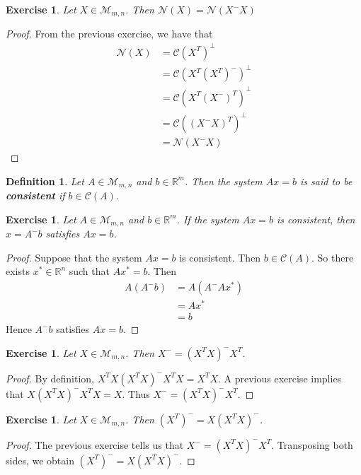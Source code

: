 \documentclass[12pt]{amsart}
\newtheorem{defn}[thm]{Definition}
\newtheorem{ex}[thm]{Exercise}
\newcommand{\R}{\mathbb{R}}
\newcommand{\MC}{\mathcal{C}}
\newcommand{\MN}{\mathcal{N}}
\newcommand{\MM}{\mathcal{M}}
\newcommand{\z}[1]{Let ${#1} \in \MM_{m,n}$}
\begin{document}
\begin{ex}
\z{X}. Then $\MN(X) = \MN(X^-X)$
\end{ex}

\begin{proof}
From the previous exercise, we have that 
\begin{align*}
\MN(X) 
&= \MC(X^T)^{\perp} \\
&= \MC(X^T(X^T)^-)^{\perp} \\
&= \MC(X^T(X^-)^T)^{\perp} \\
&= \MC((X^-X)^T)^{\perp} \\
&= \MN(X^-X)
\end{align*}
\end{proof}
\vspace{2mm}
\begin{defn}
Let $A \in \MM_{m,n}$ and $b \in \R^m$. Then the system $Ax=b$ is said to be \textbf{consistent} if $b \in \MC(A)$.
\end{defn}

\begin{ex}
Let $A \in \MM_{m,n}$ and $b \in \R^m$. If the system $Ax=b$ is consistent, then $x=A^-b$ satisfies $Ax=b$.
\end{ex}

\begin{proof}
Suppose that the system $Ax=b$ is consistent. Then $b \in \MC(A)$. So there exists $x^* \in \R^n$ such that $Ax^* = b$. Then 
\begin{align*}
A(A^{-} b)
&= A(A^{-} Ax^*) \\
&= Ax^* \\
&= b
\end{align*}
Hence $A^- b$ satisfies $Ax=b$.
\end{proof} 
\vspace{2mm}

\begin{ex}
\z{X}. Then $X^- = (X^TX)^-X^T$. 
\end{ex}

\begin{proof}
By definition, $X^TX (X^TX)^- X^TX = X^TX$. A previous exercise implies that $X(X^TX)^-X^TX = X$. Thus $X^- = (X^TX)^-X^T$.
\end{proof}

\begin{ex}
\z{X}. Then $(X^T)^- = X(X^TX)^-$. 
\end{ex}

\begin{proof}
The previous exercise tells us that $X^- = (X^TX)^-X^T$. Transposing both sides, we obtain $(X^T)^- = X(X^TX)^-$.
\end{proof}
\end{document}
